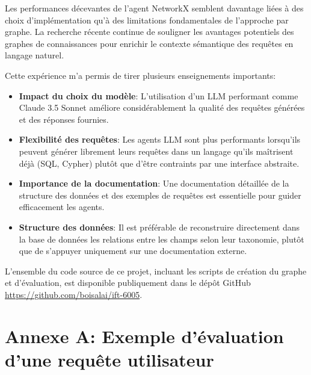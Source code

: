 \documentclass[a4paper,11pt]{article}
\begin{document}
Les performances décevantes de l'agent NetworkX semblent davantage liées à des choix d'implémentation qu'à des limitations fondamentales de l'approche par graphe. La recherche récente continue de souligner les avantages potentiels des graphes de connaissances pour enrichir le contexte sémantique des requêtes en langage naturel.

Cette expérience m'a permis de tirer plusieurs enseignements importants:
\begin{itemize}
    \item \textbf{Impact du choix du modèle}: L'utilisation d'un LLM performant comme Claude 3.5 Sonnet améliore considérablement la qualité des requêtes générées et des réponses fournies.
    
    \item \textbf{Flexibilité des requêtes}: Les agents LLM sont plus performants lorsqu'ils peuvent générer librement leurs requêtes dans un langage qu'ils maîtrisent déjà (SQL, Cypher) plutôt que d'être contraints par une interface abstraite.
    
    \item \textbf{Importance de la documentation}: Une documentation détaillée de la structure des données et des exemples de requêtes est essentielle pour guider efficacement les agents.
    
    \item \textbf{Structure des données}: Il est préférable de reconstruire directement dans la base de données les relations entre les champs selon leur taxonomie, plutôt que de s'appuyer uniquement sur une documentation externe.
\end{itemize}

L'ensemble du code source de ce projet, incluant les scripts de création du graphe et d'évaluation, est disponible publiquement dans le dépôt GitHub \url{https://github.com/boisalai/ift-6005}.


\label{sec:biblio}




\newpage
\section*{Annexe A: Exemple d'évaluation d'une requête utilisateur}
\end{document}
